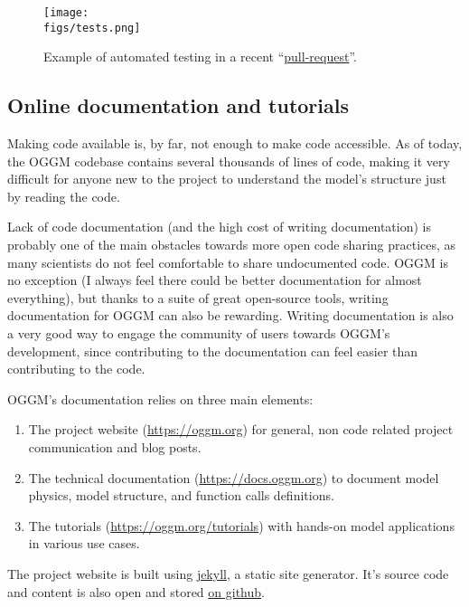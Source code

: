 \begin{figure}[h]
\centering
\texttt{[image: \\figs/tests.png]}
\caption{Example of automated testing in a recent “\href{https://github.com/OGGM/oggm/pull/1142}{pull-request}”.}
\end{figure}


\subsection{Online documentation and tutorials}

Making code available is, by far, not enough to make code accessible. As of today, the OGGM codebase contains several
thousands of lines of code, making it very difficult for anyone new to the project to understand the model’s structure
just by reading the code.

Lack of code documentation (and the high cost of writing documentation) is probably one of the main obstacles towards
more open code sharing practices, as many scientists do not feel comfortable to share undocumented code. OGGM is no
exception (I always feel there could be better documentation for almost everything), but thanks to a suite of great
open-source tools, writing documentation for OGGM can also be rewarding. Writing documentation is also a very good way
to engage the community of users towards OGGM’s development, since contributing to the documentation can feel easier
than contributing to the code.

OGGM’s documentation relies on three main elements:
\begin{enumerate}[nosep]

\item {} 
The project website (\href{https://oggm.org}{https://oggm.org}) for general, non code related project communication and blog posts.

\item {} 
The technical documentation (\href{https://docs.oggm.org}{https://docs.oggm.org}) to document model physics, model structure, and function calls
definitions.

\item {} 
The tutorials (\href{https://oggm.org/tutorials}{https://oggm.org/tutorials}) with hands-on model applications in various use cases.

\end{enumerate}

The project website is built using \href{https://jekyllrb.com/}{jekyll}, a static site generator. It’s source code and
content is also open and stored \href{https://github.com/OGGM/oggm.github.io}{on github}.

